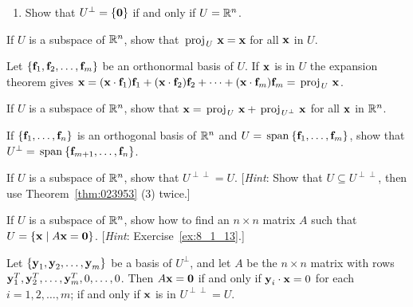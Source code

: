 \begin{multicols}{2}
\begin{ex}
\begin{enumerate}[label={\alph*.}]
\item Show that $U^\perp = \{\textbf{0}\}$ if and only if $U = \mathbb{R}^n$.

\end{enumerate}
\end{ex}

\begin{ex}
If $U$ is a subspace of $\mathbb{R}^n$, show that $\thinspace\operatorname{proj\medspace}_{\!U}\,{\textbf{x}} = \textbf{x}$ for all $\textbf{x}$ in $U$.

\begin{sol}
Let $\{\textbf{f}_{1}, \textbf{f}_{2}, \dots , \textbf{f}_{m}\}$ be an orthonormal basis of $U$. If $\textbf{x}$ is in $U$ the expansion theorem gives $\textbf{x} = (\textbf{x} \cdot \textbf{f}_{1})\textbf{f}_{1} + (\textbf{x} \cdot \textbf{f}_{2})\textbf{f}_{2} + \dots  + (\textbf{x} \cdot \textbf{f}_{m})\textbf{f}_{m} = \thinspace\operatorname{proj\medspace}_{\!U}\,{\textbf{x}}$.
\end{sol}
\end{ex}

\begin{ex}
If $U$ is a subspace of $\mathbb{R}^n$, show that $\textbf{x} = \thinspace\operatorname{proj\medspace}_{\!U}\,{\textbf{x}} + \thinspace\operatorname{proj\medspace}_{\!U^\perp}\,{\textbf{x}}$ for all $\textbf{x}$ in $\mathbb{R}^n$.
\end{ex}

\begin{ex}
If $\{\textbf{f}_{1}, \dots, \textbf{f}_{n}\}$ is an orthogonal basis of $\mathbb{R}^n$ and $U = \thinspace\operatorname{span\medspace}\{\textbf{f}_{1}, \dots, \textbf{f}_{m}\}$, show that \\ $U^\perp = \thinspace\operatorname{span\medspace}\{\textbf{f}_{m + 1}, \dots, \textbf{f}_{n}\}$.
\end{ex}

\begin{ex}\label{ex:8_1_13}
If $U$ is a subspace of $\mathbb{R}^n$, show that $U^{\perp \perp} = U$. [\textit{Hint}: Show that $U \subseteq U^{\perp \perp}$, then use Theorem~\ref{thm:023953} (3) twice.]
\end{ex}

\begin{ex}
If $U$ is a subspace of $\mathbb{R}^n$, show how to find an $n \times n$ matrix $A$ such that $U = \{\textbf{x} \mid A\textbf{x} = \textbf{0}\}$. [\textit{Hint}: Exercise~\ref{ex:8_1_13}.]

\begin{sol}
Let $\{\textbf{y}_{1}, \textbf{y}_{2}, \dots, \textbf{y}_{m}\}$ be a basis of $U^\perp$, and let $A$ be the $n \times n$ matrix with rows $\textbf{y}^T_1, \textbf{y}^T_2, \dots, \textbf{y}^T_m, 0, \dots, 0$. Then $A\textbf{x} = \textbf{0}$ if and only if $\textbf{y}_{i} \cdot \textbf{x} = 0$ for each $i = 1, 2, \dots, m$; if and only if $\textbf{x}$ is in $U^{\perp \perp} = U$.
\end{sol}
\end{ex}


\end{multicols}
